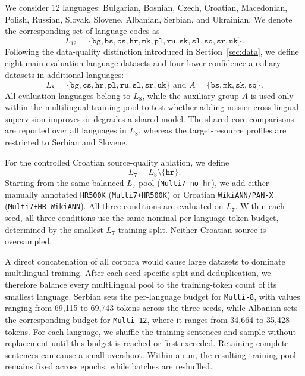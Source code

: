 \documentclass{article}
\begin{document}
We consider 12 languages: Bulgarian, Bosnian, Czech, Croatian, Macedonian, Polish, Russian, Slovak, Slovene, Albanian, Serbian, and Ukrainian. We denote the corresponding set of language codes as
\[
L_{12} = \{\texttt{bg}, \texttt{bs}, \texttt{cs}, \texttt{hr}, \texttt{mk}, \texttt{pl}, \texttt{ru}, \texttt{sk}, \texttt{sl}, \texttt{sq}, \texttt{sr}, \texttt{uk}\}.
\]
Following the data-quality distinction introduced in Section~\ref{sec:data}, we define eight main evaluation language datasets and four lower-confidence auxiliary datasets in additional languages:
\[
L_8 = \{\texttt{bg}, \texttt{cs}, \texttt{hr}, \texttt{pl}, \texttt{ru}, \texttt{sl}, \texttt{sr}, \texttt{uk}\}
\text{ and  }
A = \{\texttt{bs}, \texttt{mk}, \texttt{sk}, \texttt{sq}\}.
\]
All evaluation languages belong to $L_8$, while the auxiliary group $A$ is used only within the multilingual training pool to test whether adding noisier cross-lingual supervision improves or degrades a shared model.
The shared core comparisons are reported over all languages in $L_8$, whereas the target-resource profiles are restricted to Serbian and Slovene.

For the controlled Croatian source-quality ablation, we define
\[
L_7 = L_8 \setminus \{\texttt{hr}\}.
\]
Starting from the same balanced $L_7$ pool (\texttt{Multi7-no-hr}), we add either manually annotated \texttt{HR500K} (\texttt{Multi7+HR500K}) or Croatian \texttt{WikiANN/PAN-X} (\texttt{Multi7+HR-WikiANN}).
All three conditions are evaluated on $L_7$.
Within each seed, all three conditions use the same nominal per-language token budget, determined by the smallest $L_7$ training split.
Neither Croatian source is oversampled.

A direct concatenation of all corpora would cause large datasets to dominate multilingual training.
After each seed-specific split and deduplication, we therefore balance every multilingual pool to the training-token count of its smallest language.
Serbian sets the per-language budget for \texttt{Multi-8}, with values ranging from 69{,}115 to 69{,}743 tokens across the three seeds, while Albanian sets the corresponding budget for \texttt{Multi-12}, where it ranges from 34{,}664 to 35{,}428 tokens.
For each language, we shuffle the training sentences and sample without replacement until this budget is reached or first exceeded.
Retaining complete sentences can cause a small overshoot.
Within a run, the resulting training pool remains fixed across epochs, while batches are reshuffled.
\end{document}
